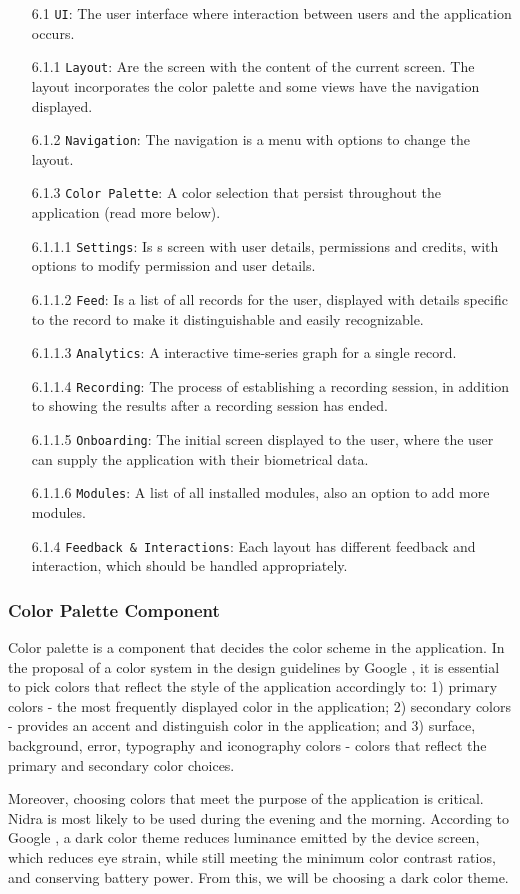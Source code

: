 \begin{itemize}
    \item[6.1] \verb|UI|: The user interface where interaction between users and the application occurs. 
    \item[6.1.1] \verb|Layout|: Are the screen with the content of the current screen. The layout incorporates the color palette and some views have the navigation displayed. 
    \item[6.1.2] \verb|Navigation|: The navigation is a menu with options to change the layout. 
    \item[6.1.3] \verb|Color Palette|: A color selection that persist throughout the application (read more below).
    \item[6.1.1.1] \verb|Settings|: Is s screen with user details, permissions and credits, with options to modify permission and user details.
    \item[6.1.1.2] \verb|Feed|: Is a list of all records for the user, displayed with details specific to the record to make it distinguishable and easily recognizable. 
    \item[6.1.1.3] \verb|Analytics|: A interactive time-series graph for a single record. 
    \item[6.1.1.4] \verb|Recording|: The process of establishing a recording session, in addition to showing the results after a recording session has ended. 
    \item[6.1.1.5] \verb|Onboarding|: The initial screen displayed to the user, where the user can supply the application with their biometrical data. 
    \item[6.1.1.6] \verb|Modules|: A list of all installed modules, also an option to add more modules. 
    \item[6.1.4] \verb|Feedback & Interactions|: Each layout has different feedback and interaction, which should be handled appropriately. 
\end{itemize}

\subsubsection{Color Palette Component}
Color palette is a component that decides the color scheme in the application. In the proposal of a color system in the design guidelines by Google \cite{colorsystem}, it is essential to pick colors that reflect the style of the application accordingly to: 1) primary colors - the most frequently displayed color in the application; 2) secondary colors - provides an accent and distinguish color in the application; and 3) surface, background, error, typography and iconography colors - colors that reflect the primary and secondary color choices. 

Moreover, choosing colors that meet the purpose of the application is critical. Nidra is most likely to be used during the evening and the morning. According to Google \cite{darktheme}, a dark color theme reduces luminance emitted by the device screen, which reduces eye strain, while still meeting the minimum color contrast ratios, and conserving battery power. From this, we will be choosing a dark color theme. 